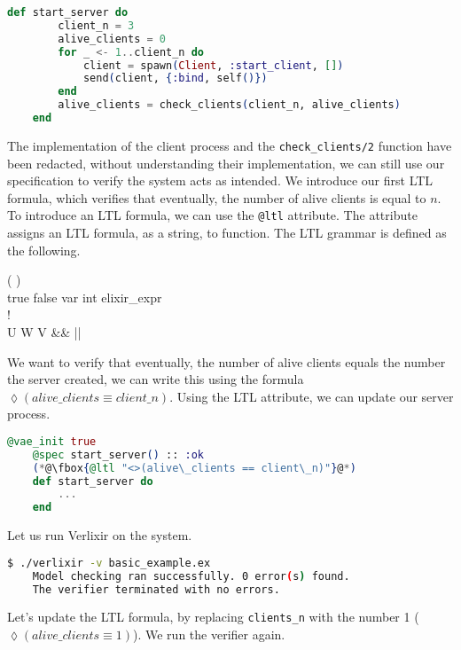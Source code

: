 \begin{lstlisting}[language=Elixir, xleftmargin=.2\linewidth]
    def start_server do
        client_n = 3
        alive_clients = 0
        for _ <- 1..client_n do
            client = spawn(Client, :start_client, [])
            send(client, {:bind, self()})
        end
        alive_clients = check_clients(client_n, alive_clients)
    end
\end{lstlisting}
The implementation of the client process and the \texttt{check\_clients/2} function have been redacted, without understanding their implementation, we can still use our specification to verify the system acts as intended. We introduce our first LTL formula, which verifies that eventually, the number of alive clients is equal to $n$. To introduce an LTL formula, we can use the \texttt{@ltl} attribute. The attribute assigns an LTL formula, as a string, to function. The LTL grammar is defined as the following.
\begin{bnf*}
      { \bnfor (  ) \bnfor {}   \bnfor {} }\\
      {true \bnfor false \bnfor var \bnfor int \bnfor elixir\_expr}\\
      {\square \bnfor \lozenge \bnfor !}\\
      {U \bnfor W \bnfor V \bnfor \&\& \bnfor || \bnfor \rightarrow \bnfor \leftrightarrow }\\
\end{bnf*}
We want to verify that eventually, the number of alive clients equals the number the server created, we can write this using the formula $\lozenge (alive\_clients \equiv client\_n)$. Using the LTL attribute, we can update our server process.
\begin{lstlisting}[language=Elixir, xleftmargin=.3\linewidth, caption={Example LTL property}]
    @vae_init true
    @spec start_server() :: :ok
    (*@\fbox{@ltl "<>(alive\_clients == client\_n)"}@*)
    def start_server do
        ...
    end
\end{lstlisting}
Let us run Verlixir on the system.
\begin{lstlisting}[language=bash, xleftmargin=.3\linewidth]
    $ ./verlixir -v basic_example.ex
    Model checking ran successfully. 0 error(s) found.
    The verifier terminated with no errors.
\end{lstlisting}
Let's update the LTL formula, by replacing \texttt{clients\_n} with the number 1 ($\lozenge (alive\_clients \equiv 1)$). We run the verifier again.
